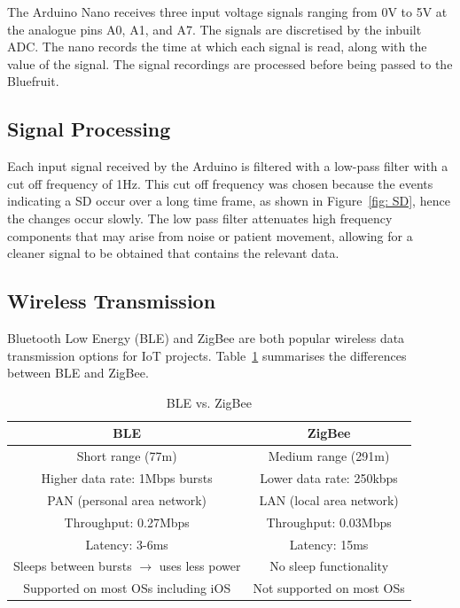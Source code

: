 The Arduino Nano receives three input voltage signals ranging from 0V to 5V at the analogue pins A0, A1, and A7. The signals are discretised by the inbuilt ADC. The nano records the time at which each signal is read, along with the value of the signal. The signal recordings are processed before being passed to the Bluefruit.





\subsection{Signal Processing}
Each input signal received by the Arduino is filtered with a low-pass filter with a cut off frequency of 1Hz. This cut off frequency was chosen because the events indicating a SD occur over a long time frame, as shown in Figure~\ref{fig: SD}, hence the changes occur slowly. The low pass filter attenuates high frequency components that may arise from noise or patient movement, allowing for a cleaner signal to be obtained that contains the relevant data.







\subsection{Wireless Transmission}
Bluetooth Low Energy (BLE) and ZigBee are both popular wireless data transmission options for IoT projects. Table~\ref{table:BLE vs ZigBee} summarises the differences between BLE and ZigBee.

\begin{table}[H]
\centering
\begin{tabular}{||c c||} 
 \hline
 BLE & ZigBee \\ [0.5ex] 
 \hline\hline
 Short range (77m) & Medium range (291m) \\
 Higher data rate: 1Mbps bursts & Lower data rate: 250kbps \\ 
 PAN (personal area network) & LAN (local area network) \\
 Throughput: 0.27Mbps & Throughput: 0.03Mbps \\
 Latency: 3-6ms & Latency: 15ms \\
 Sleeps between bursts $\rightarrow$ uses less power & No sleep functionality \\
 Supported on most OSs including iOS & Not supported on most OSs \\
 \hline
\end{tabular}
\caption{BLE vs. ZigBee \cite{Ray2015, Christiano}}
\label{table:BLE vs ZigBee}
\end{table}


